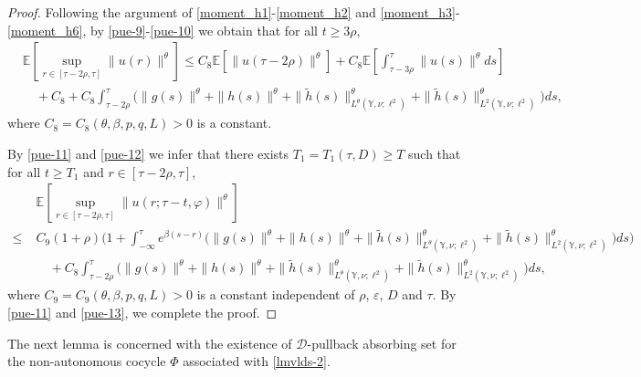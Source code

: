 \documentclass[11pt]{article}
\numberwithin{equation}{section}
\theoremstyle{plain}
\begin{document}
\begin{proof}
Following the argument of  \eqref{moment_h1}-\eqref{moment_h2} and \eqref{moment_h3}-\eqref{moment_h6},
  by \eqref{pue-9}-\eqref{pue-10}  we obtain that for all $t \ge {  3}\rho$,  
 \begin{align}\label{pue-12}
 	&  
 	\mathbb{E}\left[
 	\sup_{r \in [\tau - 2\rho,\tau]} \|u(r)\|^{\theta}
 	\right] 
 	\le  C_8
 	\mathbb{E}\left[ \|u(\tau - 2\rho)\|^{\theta} \right]
 	+ C_8 
 	\mathbb{E}\left[
 	\int_{\tau- 3\rho}^{\tau}
 	\|u(s)\|^{\theta} ds
 	\right]
 	 \nonumber\\
 	&\quad
 	+C_8
 	+C_8 
 	   \int_{\tau - 2\rho}^{\tau}
 	\big(
 	\|g(s)\|^{\theta}
 	+ \|h(s)\|^{\theta}
 	+ \|\widetilde{h}(s)\|^{\theta}_{L^\theta(\mathbb{Y}, \nu; \ell^2)}
 	+ \|\widetilde{h}(s)\|^{\theta}_{L^{2}(\mathbb{Y}, \nu; \ell^2)}
 	\big) ds,
 	 \end{align}
 where $C_8
 =C_8(\theta, \beta, p,q, L)>0$ 
 is a constant.
 
 By \eqref{pue-11} and \eqref{pue-12}
 we infer that
 there exists $T_1 = T_1(\tau, D) 
 \ge T$ such that for all $t \ge T_1$ and $r \in [\tau -2\rho, \tau]$,
\begin{align} \label{pue-13}
	& \mathbb{E}\left[
	\sup_{r \in [\tau - 2\rho,\tau]}
	\|u(r;\tau-t,\varphi)\|^{\theta}
	\right]   \nonumber\\
	\le\;&
	C_9 (1+\rho)
  \Bigg(
	1
	+ \int_{-\infty}^{\tau} e^{\beta(s-r)}
	\Big(
	\|g(s)\|^{\theta}
	+ \|h(s)\|^{\theta}
	+ \|\widetilde{h}(s)\|^{\theta}_{L^{\theta}(\mathbb{Y}, \nu; \ell^2)}
	+ \|\widetilde{h}(s)\|^{\theta}_{L^{2}(\mathbb{Y}, \nu; \ell^2)}
	\Big) ds                       
	\Bigg)   \nonumber\\
	& \quad
  +C_8 
 	   \int_{\tau - 2\rho}^{\tau}
 	\big(
 	\|g(s)\|^{\theta}
 	+ \|h(s)\|^{\theta}
 	+ \|\widetilde{h}(s)\|^{\theta}_{L^{\theta}(\mathbb{Y}, \nu; \ell^2)}
 	+ \|\widetilde{h}(s)\|^{\theta}_{L^{2}(\mathbb{Y}, \nu; \ell^2)}
 	\big) ds,
 	 \end{align}
 where $C_9
 =C_9(\theta, \beta, p,q, L)>0$ 
 is a constant independent of $\rho$,
 $\varepsilon$, $D$  and $\tau$.
 By  \eqref{pue-11} and \eqref{pue-13}, we complete 
  the proof.
\end{proof}

 



 
 The next lemma
 is concerned 
 with  the existence of $ \mathcal{D} $-pullback absorbing set
 for the non-autonomous cocycle $\Phi$ associated with \eqref{lmvlds-2}.
\end{document}
